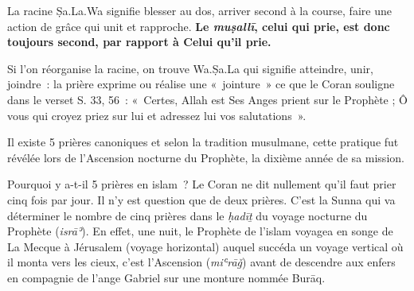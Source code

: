 



La racine Ṣa.La.Wa signifie blesser au dos, arriver second à la course,
faire une action de grâce qui unit et rapproche. \textbf{Le
\emph{muṣallī}, celui qui prie, est donc toujours second, par rapport à
Celui qu'il prie.}

Si l'on réorganise la racine, on trouve Wa.Ṣa.La qui signifie atteindre,
unir, joindre~: la prière exprime ou réalise une «~jointure~» ce que le
Coran souligne dans le verset S. 33, 56~: «~Certes, Allah est Ses Anges
prient sur le Prophète ; Ô vous qui croyez priez sur lui et adressez lui
vos salutations~».


Il existe 5 prières canoniques et selon la tradition musulmane, cette
pratique fut révélée lors de l'Ascension nocturne du Prophète, la
dixième année de sa mission.


Pourquoi y a-t-il 5 prières en islam~? Le Coran ne dit nullement qu'il
faut prier cinq fois par jour. Il n'y est question que de deux prières.
C'est la Sunna qui va déterminer le nombre de cinq prières dans le
\emph{ḥadīṯ} du voyage nocturne du Prophète (\emph{isrāʾ}). En effet,
une nuit, le Prophète de l'islam voyagea en songe de La Mecque à
Jérusalem (voyage horizontal) auquel succéda un voyage vertical où il
monta vers les cieux, c'est l'Ascension (\emph{miʿrāǧ}) avant de
descendre aux enfers en compagnie de l'ange Gabriel sur une monture
nommée Burāq.

